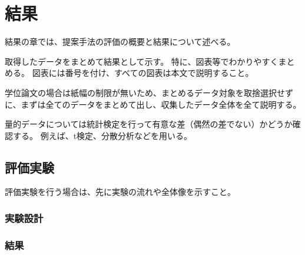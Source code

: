 \chapter{結果}
\label{chap:result}

結果の章では、提案手法の評価の概要と結果について述べる。

取得したデータをまとめて結果として示す。
特に、図表等でわかりやすくまとめる。
図表には番号を付け、すべての図表は本文で説明すること。

学位論文の場合は紙幅の制限が無いため、まとめるデータ対象を取捨選択せずに、まずは全てのデータをまとめて出し、収集したデータ全体を全て説明する。

量的データについては統計検定を行って有意な差（偶然の差でない）かどうか確認する。
例えば、t検定、分散分析などを用いる。

\section{評価実験}

評価実験を行う場合は、先に実験の流れや全体像を示すこと。

\subsection{実験設計}

\subsection{結果}
